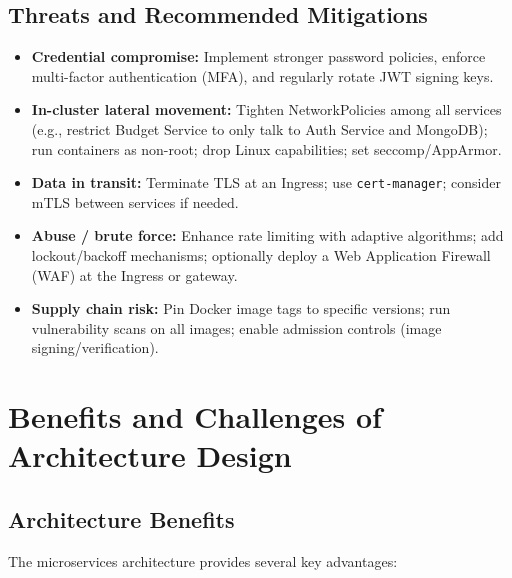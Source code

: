 \documentclass[conference]{IEEEtran}
\begin{document}
\subsection{Threats and Recommended Mitigations}
\begin{itemize}
  \item \textbf{Credential compromise:} Implement stronger password policies, enforce multi-factor authentication (MFA), and regularly rotate JWT signing keys.
  \item \textbf{In-cluster lateral movement:} Tighten NetworkPolicies among all services (e.g., restrict Budget Service to only talk to Auth Service and MongoDB); run containers as non-root; drop Linux capabilities; set seccomp/AppArmor.
  \item \textbf{Data in transit:} Terminate TLS at an Ingress; use \texttt{cert-manager}; consider mTLS between services if needed.
  \item \textbf{Abuse / brute force:} Enhance rate limiting with adaptive algorithms; add lockout/backoff mechanisms; optionally deploy a Web Application Firewall (WAF) at the Ingress or gateway.
  \item \textbf{Supply chain risk:} Pin Docker image tags to specific versions; run vulnerability scans on all images; enable admission controls (image signing/verification).
\end{itemize}

\section{\textbf{Benefits and Challenges of Architecture Design}}

\subsection{Architecture Benefits}
The microservices architecture provides several key advantages:
\end{document}
